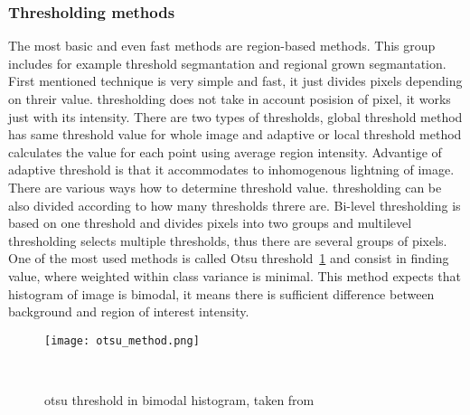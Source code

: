 \subsubsection{Thresholding methods}

        The most basic and even fast methods are region-based methods. This group includes for example threshold segmantation and regional grown segmantation.
        First mentioned technique is very simple and fast, it just divides pixels depending on threir value. thresholding does not take in account posision of pixel,
        it works just with its intensity. There are two types of thresholds, global threshold method has same threshold value for whole image and adaptive or local
        threshold method calculates the value for each point using average region intensity. Advantige of adaptive threshold is that it accommodates to inhomogenous
        lightning of image. There are various ways how to determine threshold value. thresholding can be also divided according to how many thresholds threre are.
        Bi-level thresholding is based on one threshold and divides pixels into two groups and multilevel thresholding selects multiple thresholds, thus there are several groups of pixels.
        One of the most used methods is called Otsu threshold~\ref{fig:otsu} and consist in finding value, where weighted within class variance is minimal. This method expects that histogram of image
        is bimodal, it means there is sufficient difference between background and region of interest intensity. \cite{15, 16, 17, 18}
        
        \begin{figure}[h]
            \texttt{[image: otsu\_method.png]}
            \caption{otsu threshold in bimodal histogram, taken from~\cite{20}}~\label{fig:otsu}
        \end{figure}

